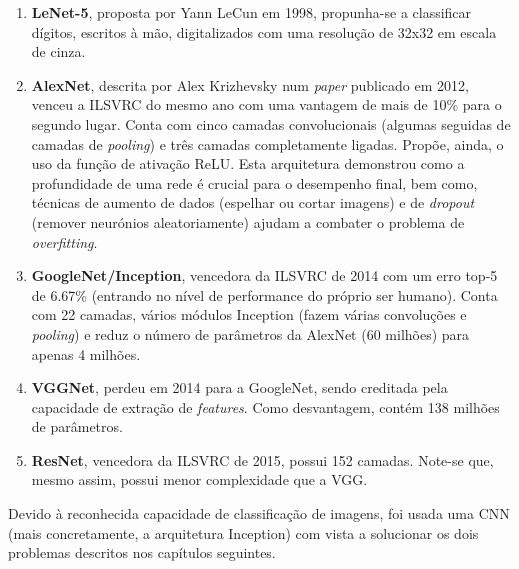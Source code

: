 \begin{enumerate}
    \item \textbf{LeNet-5}, proposta por Yann LeCun em 1998, propunha-se a classificar dígitos, escritos à mão, digitalizados com uma resolução de 32x32 em escala de cinza.
    \item \textbf{AlexNet}, descrita por Alex Krizhevsky num \textit{paper} publicado em 2012, venceu a \ac{ILSVRC} do mesmo ano com uma vantagem de mais de 10\% para o segundo lugar. Conta com cinco camadas convolucionais (algumas seguidas de camadas de \textit{pooling}) e três camadas completamente ligadas. Propõe, ainda, o uso da função de ativação ReLU. Esta arquitetura demonstrou como a profundidade de uma rede é crucial para o desempenho final, bem como, técnicas de aumento de dados (espelhar ou cortar imagens) e de \textit{dropout} (remover neurónios aleatoriamente) ajudam a combater o problema de \textit{overfitting}.
    \item \textbf{GoogleNet/Inception}, vencedora da \ac{ILSVRC} de 2014 com um erro top-5 de 6.67\% (entrando no nível de performance do próprio ser humano). Conta com 22 camadas, vários módulos Inception (fazem várias convoluções e \textit{pooling}) e reduz o número de parâmetros da AlexNet (60 milhões) para apenas 4 milhões.
    \item \textbf{VGGNet}, perdeu em 2014 para a GoogleNet, sendo creditada pela capacidade de extração de \textit{features}. Como desvantagem, contém 138 milhões de parâmetros.
    \item \textbf{ResNet}, vencedora da  \ac{ILSVRC} de 2015, possui 152 camadas. Note-se que, mesmo assim, possui menor complexidade que a VGG.
\end{enumerate}

\noindent Devido à reconhecida capacidade de classificação de imagens, foi usada uma \ac{CNN} (mais concretamente, a arquitetura Inception) com vista a solucionar os dois problemas descritos nos capítulos seguintes.